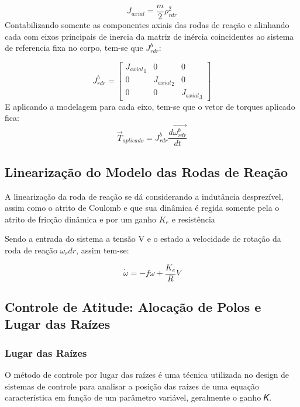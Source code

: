 \begin{equation}{J_{axial}}=\frac{m}{2}\rho^2_{rdr}\end{equation}Contabilizando somente as componentes axiais das rodas de reação e alinhando cada com eixos principais de inercia da matriz de inércia coincidentes ao sistema de referencia fixa no corpo, tem-se que   $J^b_{rdr}$:

\begin{equation}J^b_{rdr} =\begin{bmatrix}
{J_{axial}}_1&0&0 \\0 &{J_{axial}}_2&0 \\ 0&0&{J_{axial}}_3
\end{bmatrix}\end{equation}E aplicando a modelagem para cada eixo, tem-se que o vetor de torques aplicado fica:
\begin{equation}
\vec{T}_{aplicado}=J^b_{rdr}\frac{d\vec{\omega^b_{rdr}}}{dt}
\end{equation}


\subsection{Linearização do Modelo das Rodas de Reação}\label{sec:3.1.6.3}

A linearização da roda de reação se dá considerando a indutância desprezível, assim como o atrito de Coulomb e que sua dinâmica é regida somente pela o atrito de fricção dinâmica e por um ganho $K_e$ e resistência

Sendo a entrada do sistema a tensão V e o estado a velocidade de rotação da roda de reação $\omega_rdr$, assim tem-se:

\begin{equation}
	\dot{\omega} = -f\omega+\frac{K_e}{R}V
\end{equation}


\subsection{Controle de Atitude: Alocação de Polos e Lugar das Raízes}\label{sec:3.1.6}

\subsubsection{Lugar das Raízes}


O método de controle por lugar das raízes é uma técnica utilizada no design de sistemas de controle para analisar a posição das raízes de uma equação característica em função de um parâmetro variável, geralmente o ganho 𝐾.

